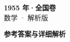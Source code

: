 \documentclass[zihao=-4, a4paper]{ctexart}
\begin{document}
\begin{center}
  {\Large\bfseries 1955 年·全国卷}\\[4pt]
  {\large 数学 · 解析版}
\end{center}
\medskip
{}

\clearpage
{}
\begin{center}{\Large\bfseries 参考答案与详细解析}\end{center}
\medskip

\end{document}
